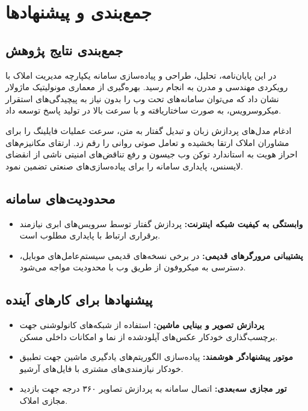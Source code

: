 \documentclass[11pt, a4paper]{report}
\begin{document}
\chapter{جمع‌بندی و پیشنهادها}

\section{جمع‌بندی نتایج پژوهش}
در این پایان‌نامه، تحلیل، طراحی و پیاده‌سازی سامانه یکپارچه مدیریت املاک با رویکردی مهندسی و مدرن به انجام رسید. بهره‌گیری از معماری مونولیتیک ماژولار نشان داد که می‌توان سامانه‌های تحت وب را بدون نیاز به پیچیدگی‌های استقرار میکروسرویس، به صورت ساختاریافته و با سرعت بالا در تولید پاسخ توسعه داد.

ادغام مدل‌های پردازش زبان و تبدیل گفتار به متن، سرعت عملیات فایلینگ را برای مشاوران املاک ارتقا بخشیده و تعامل صوتی روانی را رقم زد. %
ارتقای مکانیزم‌های احراز هویت به استاندارد توکن وب جیسون و رفع تناقض‌های امنیتی ناشی از انقضای لایسنس، پایداری سامانه را برای پیاده‌سازی‌های صنعتی تضمین نمود.

\section{محدودیت‌های سامانه}
\begin{itemize}
    \item \textbf{وابستگی به کیفیت شبکه اینترنت:} پردازش گفتار توسط سرویس‌های ابری نیازمند برقراری ارتباط با پایداری مطلوب است.
    \item \textbf{پشتیبانی مرورگرهای قدیمی:} در برخی نسخه‌های قدیمی سیستم‌عامل‌های موبایل، دسترسی به میکروفون از طریق وب با محدودیت مواجه می‌شود.
\end{itemize}

\section{پیشنهادها برای کارهای آینده}
\begin{itemize}
    \item \textbf{پردازش تصویر و بینایی ماشین:} استفاده از شبکه‌های کانولوشنی جهت برچسب‌گذاری خودکار عکس‌های آپلودشده از نما و امکانات داخلی مسکن.
    \item \textbf{موتور پیشنهادگر هوشمند:} پیاده‌سازی الگوریتم‌های یادگیری ماشین جهت تطبیق خودکار نیازمندی‌های مشتری با فایل‌های آرشیو.
    \item \textbf{تور مجازی سه‌بعدی:} اتصال سامانه به پردازش تصاویر ۳۶۰ درجه جهت بازدید مجازی املاک.
\end{itemize}
\end{document}
